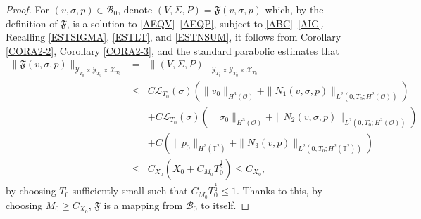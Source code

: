 \documentclass[12pt,reqno]{amsart}
\numberwithin{equation}{section}
\begin{document}
\begin{proof}
For $(v,\sigma, p)\in\mathscr B_0$, denote
$(V,\Sigma,P)=\mathfrak F(v,\sigma,p)$ which, by the definition of $\mathfrak F$, is a solution to
\eqref{AEQV}--\eqref{AEQP}, subject to \eqref{ABC}--\eqref{AIC}.
Recalling \eqref{ESTSIGMA}, \eqref{ESTLT}, and \eqref{ESTNSUM},
it follows from Corollary \ref{CORA2-2}, Corollary \ref{CORA2-3}, and the standard parabolic estimates that
\begin{eqnarray*}
\|\mathfrak F(v,\sigma,p)\|_{\mathscr Y_{T_0}\times\mathscr Y_{T_0}\times\mathscr X_{T_0}}
&=&\|(V,\Sigma,P)\|_{\mathscr Y_{T_0}\times\mathscr Y_{T_0}\times\mathscr X_{T_0}}\nonumber\\
  &\leq& C\mathcal L_{T_0}(\sigma)\left(\|v_0\|_{H^3(\mathcal O)}+\|N_1(v,\sigma,p)\|_{L^2(0,T_0;H^2(\mathcal O))}\right)\nonumber\\
 &&+C\mathcal L_{T_0}(\sigma)\left(\|\sigma_0\|_{H^3(\mathcal O)}+\|N_2(v,\sigma,p)\|_{L^2(0,T_0;H^2(\mathcal O))}\right)\nonumber\\
 &&+ C(\|p_0\|_{H^3(\mathbb T^2)}+\|N_3(v,p)\|_{L^2(0,T_0;H^2(\mathbb T^2))})\nonumber\\
  &\leq& C_{X_0}\left(X_0+C_{M_0}T_0^\frac12\right)\leq C_{X_0},
\end{eqnarray*}
by choosing $T_0$ sufficiently small such that $C_{M_0}T_0^\frac12\leq1$. Thanks to this, by choosing $M_0\geq C_{X_0}$, $\mathfrak F$ is a mapping from $\mathscr B_0$ to itself.


\end{proof}
\end{document}
